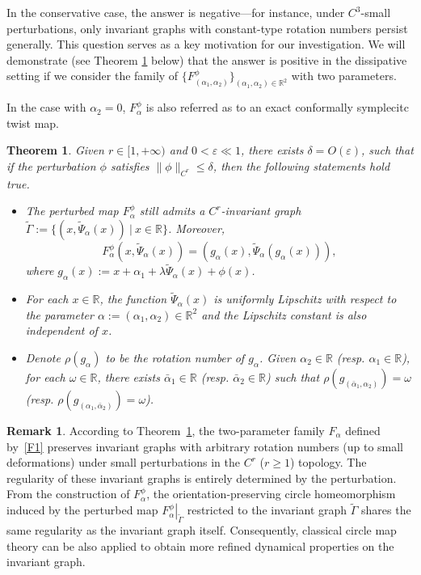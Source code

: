 \documentclass{amsart}
\newcommand{\R}{\mathbb{R}}
\newcommand{\al}{\alpha}
\newcommand{\eps}{\varepsilon}
\newtheorem{Theorem}{Theorem}
\theoremstyle{definition}
\newtheorem{Remark}[Definition]{Remark}
\begin{document}
 In the conservative case, the answer is negative---for instance, under $C^3$-small perturbations, only invariant graphs with constant-type rotation numbers persist generally. This question serves as a key motivation for our investigation. We will demonstrate (see Theorem \ref{M1} below) that the answer is positive in the dissipative setting if we consider the family of $\{F^{\phi}_{(\al_1,\al_2)}\}_{(\al_1,\al_2)\in\R^2}$ with two parameters.




  In the case with $\al_2=0$, $F^{\phi}_{\al}$ is also referred as to an exact conformally symplecitc twist map.
\begin{Theorem}\label{M1}
Given $r\in [1,+\infty)$ and $0<\eps\ll 1$, there exists $\delta=O(\eps)$, such that if the perturbation $\phi$ satisfies $\|\phi\|_{C^r}\leq \delta$, then the following statements hold true.
\begin{itemize}
\item [(1)] The perturbed map $F^{\phi}_{\al}$ still admits a $C^r$-invariant graph $\tilde{\Gamma}:=\{(x,\tilde{\Psi}_{\al}(x))\ |\ x\in \R\}$. Moreover,
\[F^{\phi}_{\al}(x,\tilde{\Psi}_{\al}(x))=(g_{\al}(x), \tilde{\Psi}_{\al}(g_{\al}(x))),\]
where $g_{\al}(x):=x+\al_1+\lambda\tilde{\Psi}_{\al}(x)+\phi(x)$.
\item [(2)] For each $x\in \R$, the function $\tilde{\Psi}_\alpha(x)$ is uniformly Lipschitz with respect to the parameter $\alpha:=(\alpha_1,\alpha_2)\in \R^2$ and the Lipschitz constant is also independent of $x$.
\item [(3)] Denote $\rho(g_{\al})$ to be the rotation number of $g_{\al}$.  Given $\al_2\in\R$ (resp. $\al_1\in\R$), for each $\omega\in\R$, there exists $\bar{\al}_1\in\R$ (resp. $\bar{\al}_2\in\R$) such that $\rho(g_{(\bar{\al}_1,\al_2)})=\omega$ (resp. $\rho(g_{({\al}_1,\bar{\al}_2)})=\omega$).
\end{itemize}
\end{Theorem}


\begin{Remark}
According to Theorem~\ref{M1}, the two-parameter family $F_{\al}$ defined by~\eqref{F1} preserves invariant graphs with arbitrary rotation numbers  (up to small deformations) under small perturbations in the $C^r$ ($r \geq 1$) topology. The regularity of these invariant graphs is entirely determined by the perturbation. From the construction of $F^{\phi}_{\alpha}$, the orientation-preserving circle homeomorphism induced by the perturbed map $\left.F^{\phi}_{\alpha}\right|_{\tilde{\Gamma}}$ restricted to the invariant graph $\tilde{\Gamma}$ shares the same regularity as the invariant graph itself. Consequently, classical circle map theory  can be also applied to obtain more refined dynamical properties on the invariant graph.
\end{Remark}
\end{document}
